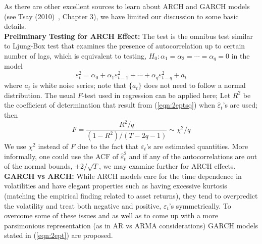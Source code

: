 As there are other excellent sources to learn about ARCH and GARCH models (see Tsay (2010)~\cite{tsay}, Chapter 3), we have limited our discussion to some basic details. \\


\noindent\textbf{Preliminary Testing for ARCH Effect:} The test is the omnibus test similar to Ljung-Box test that examines the presence of autocorrelation up to certain number of lags, which is equivalent to testing, $H_0: \alpha_1 = \alpha_2= \cdots = \alpha_q = 0$ in the model
	\begin{equation}\label{eqn:2eptsq}
	\varepsilon_t^2 = \alpha_0 + \alpha_1\varepsilon_{t-1}^2 + \cdots + \alpha_q\varepsilon_{t-q}^2 + a_t
	\end{equation}
where $a_t$ is white noise series; note that $\{a_t\}$ does not need to follow a normal distribution. The usual $F$-test used in regression can be applied here; Let $R^2$ be the coefficient of determination that result from (\ref{eqn:2eptsq}) when $\hat{\varepsilon}_t$'s are used; then
	\begin{equation}\label{eqn:2F}
	F = \frac{R^2/q}{(1 - R^2)/(T - 2q - 1)} \sim \chi^2/q
	\end{equation}
We use $\chi^2$ instead of $F$ due to the fact that $\varepsilon_t$'s are estimated quantities. More informally, one could use the ACF of $\hat{\varepsilon}_t^2$ and if any of the autocorrelations are out of the normal bounds, $\pm 2/\sqrt{T}$, we may examine further for ARCH effects. \\


\noindent\textbf{GARCH vs ARCH:} While ARCH models care for the time dependence in volatilities and have elegant properties such as having excessive kurtosis (matching the empirical finding related to asset returns), they tend to overpredict the volatility and treat both negative and positive, $\varepsilon_t$'s symmetrically. To overcome some of these issues and as well as to come up with a more parsimonious representation (as in AR vs ARMA considerations) GARCH models stated in (\ref{eqn:2ept}) are proposed. \\


